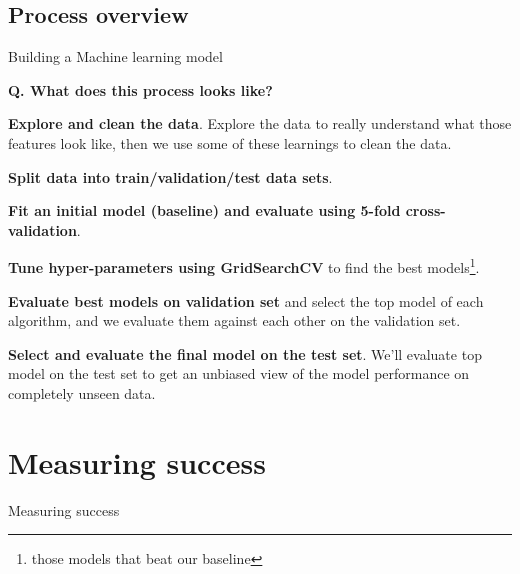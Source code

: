 \subsection{Process overview}
\begin{transitionsubframe}
  \begin{center}
    \Huge Building a Machine learning model
  \end{center}
\end{transitionsubframe}

\begin{frame}[fragile]{\textbf{Q. What does this process looks like?}}
  \begin{wideitemize}
    \item \textbf{Explore and clean the data}. Explore the data to really understand
    what those features look like, then we use some of these learnings to clean the data.
    \item \textbf{Split data into train/validation/test data sets}.
    \item \textbf{Fit an initial model (baseline) and evaluate using 5-fold cross-validation}.
    \item \textbf{Tune hyper-parameters using GridSearchCV} to find the best models\footnote{those models that beat our baseline}.
    \item \textbf{Evaluate best models on validation set} and select the top model of each
    algorithm, and we evaluate them against each other on the validation set.
    \item \textbf{Select and evaluate the final model on the test set}. We'll evaluate top
    model on the test set to get an unbiased view of the model performance on completely unseen data.
  \end{wideitemize}
\end{frame}

\section{Measuring success}
\begin{transitionframe}
  \begin{center}
    \Huge Measuring success
  \end{center}
\end{transitionframe}


